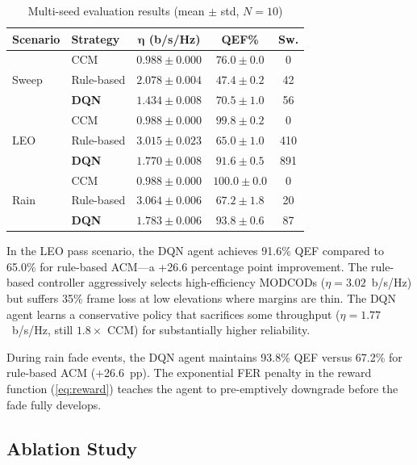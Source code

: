 \documentclass[conference]{IEEEtran}
\begin{document}
\begin{table}[t]
\centering
\caption{Multi-seed evaluation results (mean $\pm$ std, $N{=}10$)}
\label{tab:multiseed}
\renewcommand{\arraystretch}{1.15}
\small
\begin{tabular}{llccc}
\toprule
\textbf{Scenario} & \textbf{Strategy} & $\boldsymbol{\eta}$ \textbf{(b/s/Hz)} & \textbf{QEF\%} & \textbf{Sw.} \\
\midrule
\multirow{3}{*}{Sweep}
  & CCM        & $0.988 \pm 0.000$ & $76.0 \pm 0.0$ & 0 \\
  & Rule-based & $2.078 \pm 0.004$ & $47.4 \pm 0.2$ & 42 \\
  & \textbf{DQN} & $1.434 \pm 0.008$ & $\mathbf{70.5 \pm 1.0}$ & 56 \\
\midrule
\multirow{3}{*}{LEO}
  & CCM        & $0.988 \pm 0.000$ & $99.8 \pm 0.2$ & 0 \\
  & Rule-based & $3.015 \pm 0.023$ & $65.0 \pm 1.0$ & 410 \\
  & \textbf{DQN} & $1.770 \pm 0.008$ & $\mathbf{91.6 \pm 0.5}$ & 891 \\
\midrule
\multirow{3}{*}{Rain}
  & CCM        & $0.988 \pm 0.000$ & $100.0 \pm 0.0$ & 0 \\
  & Rule-based & $3.064 \pm 0.006$ & $67.2 \pm 1.8$ & 20 \\
  & \textbf{DQN} & $1.783 \pm 0.006$ & $\mathbf{93.8 \pm 0.6}$ & 87 \\
\bottomrule
\end{tabular}
\end{table}

In the LEO pass scenario, the DQN agent achieves 91.6\% QEF compared to 65.0\% for rule-based ACM---a +26.6 percentage point improvement. The rule-based controller aggressively selects high-efficiency MODCODs ($\eta = 3.02$~b/s/Hz) but suffers 35\% frame loss at low elevations where margins are thin. The DQN agent learns a conservative policy that sacrifices some throughput ($\eta = 1.77$~b/s/Hz, still $1.8\times$ CCM) for substantially higher reliability.

During rain fade events, the DQN agent maintains 93.8\% QEF versus 67.2\% for rule-based ACM (+26.6~pp). The exponential FER penalty in the reward function (\ref{eq:reward}) teaches the agent to pre-emptively downgrade before the fade fully develops.

\subsection{Ablation Study}
\end{document}
